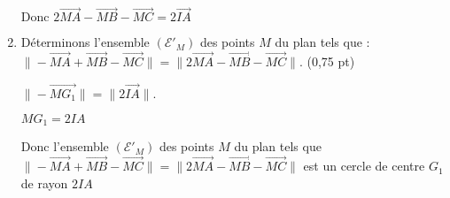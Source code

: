 \documentclass[12pt,a4paper]{article}
\begin{document}
\begin{enumerate}
$\text{Donc } 2\overrightarrow{MA} - \overrightarrow{MB} - \overrightarrow{MC}= 2\overrightarrow{IA}$
    \item Déterminons l’ensemble $(\mathscr{E}'_M)$ des points $M$ du plan tels que :\\
    \(
    \|-\overrightarrow{MA} + \overrightarrow{MB} - \overrightarrow{MC}\| = \|2\overrightarrow{MA} - \overrightarrow{MB} - \overrightarrow{MC}\|.
    \) \hfill (0,75 pt)
    
    \(
    \|-\overrightarrow{MG_1}\| = \|2\overrightarrow{IA}\|.
    \)
    
    \( MG_1 = 2IA \)
    
Donc l’ensemble $(\mathscr{E}'_M)$ des points $M$ du plan tels que \(
    \|-\overrightarrow{MA} + \overrightarrow{MB} - \overrightarrow{MC}\| = \|2\overrightarrow{MA} - \overrightarrow{MB} - \overrightarrow{MC}\| \) est un cercle de centre \(G_1\) de rayon \(2IA\)
\end{enumerate}
\end{document}
